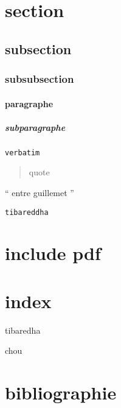 \section{section}
\subsection{subsection}
\subsubsection{subsubsection}
\paragraph{paragraphe}
\subparagraph{subparagraphe}

\begin{verbatim}
verbatim
\end{verbatim}

\begin{quote}
quote
\end{quote}


`` entre guillemet ''

\texttt{tibareddha}\\


\section{include pdf}
%



\section{index}
tibaredha

chou 
% 

\section{bibliographie}
